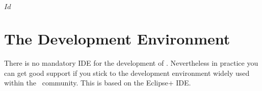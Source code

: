 \SVN$Id$
\chapter{The Development Environment}

There is no mandatory IDE for the development of \ExTeX. Nevertheless
in practice you can get good support if you stick to the development
environment widely used within the \ExTeX\ community. This is based on
the \+Eclipse+ IDE.





